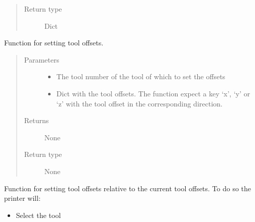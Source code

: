 \documentclass[letterpaper,10pt,english]{sphinxmanual}
\begin{document}
\begin{fulllineitems}
\begin{fulllineitems}
\begin{quote}
\begin{description}
\item[{Return type}] \leavevmode
\sphinxAtStartPar
Dict

\end{description}\end{quote}

\end{fulllineitems}


\begin{fulllineitems}
\label{\detokenize{index:diabase.diabase.set_tool_offset}}
\sphinxAtStartPar
Function for setting tool offsets.
\begin{quote}\begin{description}
\item[{Parameters}] \leavevmode\begin{itemize}
\item {} 
\sphinxAtStartPar
{} \textendash{} The tool number of the tool of which to set the offsets

\item {} 
\sphinxAtStartPar
{} \textendash{} Dict with the tool offsets. The function expect a key ‘x’, ‘y’ or ‘z’ with the tool offset in the corresponding direction.

\end{itemize}

\item[{Returns}] \leavevmode
\sphinxAtStartPar
None

\item[{Return type}] \leavevmode
\sphinxAtStartPar
None

\end{description}\end{quote}

\end{fulllineitems}


\begin{fulllineitems}
\label{\detokenize{index:diabase.diabase.set_tool_offset_differential}}
\sphinxAtStartPar
Function for setting tool offsets relative to the current tool offsets. To do so the printer will:
\begin{itemize}
\item {} 
\sphinxAtStartPar
Select the tool


\end{itemize}
\end{fulllineitems}
\end{fulllineitems}
\end{document}
